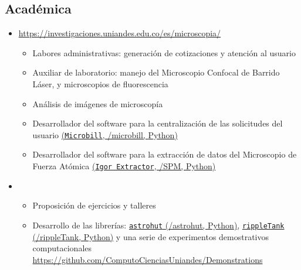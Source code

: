 \documentclass[11pt, letterpaper, sans]{moderncv}        %
\begin{document}
	\subsection{Acad\'emica}
		\begin{itemize}
			\item
			{
				{
					\url{https://investigaciones.uniandes.edu.co/es/microscopia/}
					\vspace{3pt}
					\begin{itemize}
						\item Labores administrativas: generación de cotizaciones y atención al usuario
						\item Auxiliar de laboratorio: manejo del Microscopio Confocal de Barrido Láser, y microscopios de fluorescencia
						\item Análisis de imágenes de microscopía
						\item Desarrollador del software para la centralización de las solicitudes del usuario \href{https://github.com/jsbarbosa/microbill}{(\texttt{Microbill}, \faGithub/microbill, {\color{blue} Python})}
						\item Desarrollador del software para la extracci\'on de datos del Microscopio de Fuerza Atómica
						\href{https://github.com/jsbarbosa/SPM}{(\texttt{Igor Extractor}, \faGithub/SPM, {\color{blue} Python})}
					\end{itemize}
				}
			}
			\item
			{
				{
					\vspace{3pt}
					\begin{itemize}
						\item Proposición de ejercicios y talleres
						\item Desarrollo de las librerías: \href{https://github.com/jsbarbosa/rastrohut}{\texttt{astrohut} (\faGithub/astrohut, {\color{blue} Python})},  \href{https://github.com/jsbarbosa/rippleTank}{\texttt{rippleTank} (\faGithub/rippleTank, {\color{blue} Python})} y una serie de experimentos demostrativos computacionales \url{https://github.com/ComputoCienciasUniandes/Demonstrations}

\end{itemize}}}
\end{itemize}
\end{document}
